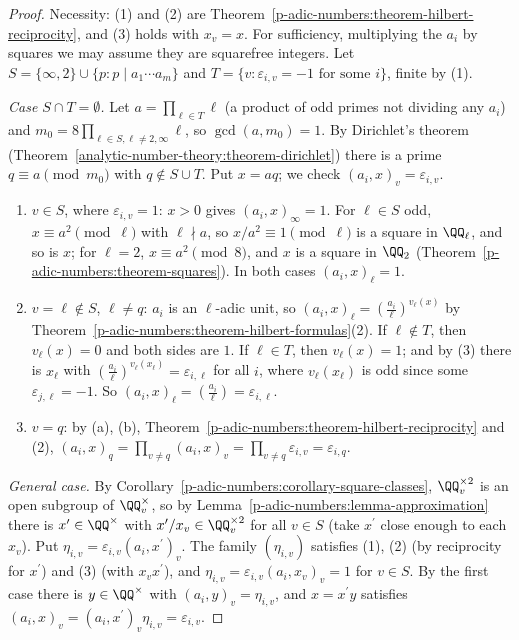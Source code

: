 \begin{proof}
Necessity: (1) and (2) are Theorem~\ref{p-adic-numbers:theorem-hilbert-reciprocity}, and (3) holds with $x_v = x$. For sufficiency, multiplying the $a_i$ by squares we may assume they are squarefree integers.
Let $S = \{\infty, 2\} \cup \{p : p \mid a_1\cdots a_m\}$ and $T = \{v : \varepsilon_{i,v} = -1 \text{ for some } i\}$, finite by (1).

\emph{Case $S \cap T = \emptyset$.} Let $a = \prod_{\ell \in T}\ell$ (a product of odd primes not dividing any $a_i$) and $m_0 = 8\prod_{\ell \in S, \ell \neq 2, \infty}\ell$, so $\gcd(a, m_0) = 1$. By Dirichlet's theorem
(Theorem~\ref{analytic-number-theory:theorem-dirichlet}) there is a prime $q \equiv a \pmod{m_0}$ with $q \notin S \cup T$. Put $x = aq$; we check $(a_i, x)_v = \varepsilon_{i,v}$.
\begin{enumerate}
\item[(a)] $v \in S$, where $\varepsilon_{i,v} = 1$: $x > 0$ gives $(a_i, x)_\infty = 1$. For $\ell \in S$ odd, $x \equiv a^2 \pmod \ell$ with $\ell \nmid a$, so $x/a^2 \equiv 1 \pmod\ell$ is a square in $\QQ_\ell$, and so is
$x$; for $\ell = 2$, $x \equiv a^2 \pmod 8$, and $x$ is a square in $\QQ_2$ (Theorem~\ref{p-adic-numbers:theorem-squares}). In both cases $(a_i, x)_\ell = 1$.
\item[(b)] $v = \ell \notin S$, $\ell \neq q$: $a_i$ is an $\ell$-adic unit, so $(a_i, x)_\ell = (\frac{a_i}{\ell})^{v_\ell(x)}$ by Theorem~\ref{p-adic-numbers:theorem-hilbert-formulas}(2). If $\ell \notin T$, then $v_\ell(x) = 0$
and both sides are $1$. If $\ell \in T$, then $v_\ell(x) = 1$; and by (3) there is $x_\ell$ with $(\frac{a_i}{\ell})^{v_\ell(x_\ell)} = \varepsilon_{i,\ell}$ for all $i$, where $v_\ell(x_\ell)$ is odd since some $\varepsilon_{j,\ell} = -1$. So
$(a_i, x)_\ell = (\frac{a_i}{\ell}) = \varepsilon_{i,\ell}$.
\item[(c)] $v = q$: by (a), (b), Theorem~\ref{p-adic-numbers:theorem-hilbert-reciprocity} and (2), $(a_i, x)_q = \prod_{v \neq q}(a_i, x)_v = \prod_{v \neq q}\varepsilon_{i,v} = \varepsilon_{i,q}$.
\end{enumerate}

\emph{General case.} By Corollary~\ref{p-adic-numbers:corollary-square-classes}, $\QQ_v^{\times2}$ is an open subgroup of $\QQ_v^\times$, so by Lemma~\ref{p-adic-numbers:lemma-approximation} there is
$x^{\prime} \in \QQ^\times$ with $x^{\prime}/x_v \in \QQ_v^{\times2}$ for all $v \in S$ (take $x^{\prime}$ close enough to each $x_v$). Put $\eta_{i,v} = \varepsilon_{i,v}(a_i, x^{\prime})_v$. The family $(\eta_{i,v})$ satisfies (1), (2) (by
reciprocity for $x^{\prime}$) and (3) (with $x_vx^{\prime}$), and $\eta_{i,v} = \varepsilon_{i,v}(a_i, x_v)_v = 1$ for $v \in S$. By the first case there is $y \in \QQ^\times$ with $(a_i, y)_v = \eta_{i,v}$, and
$x = x^{\prime}y$ satisfies $(a_i, x)_v = (a_i, x^{\prime})_v\eta_{i,v} = \varepsilon_{i,v}$.
\end{proof}

